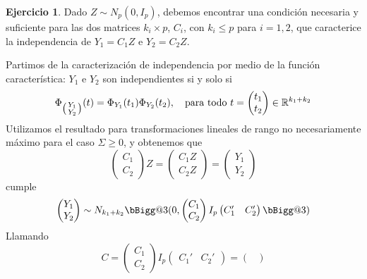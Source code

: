 \documentclass[12pt,spanish]{article}
\makeatletter
\newcommand{\vast}{\bBigg@{3}}
\theoremstyle{definition}
\newtheorem{exercise}{Ejercicio}
\makeatother
\begin{document}
\begin{exercise} %
  Dado $Z\sim N_p(0,I_p)$, debemos encontrar una condición necesaria y
  suficiente para las dos matrices $k_i\times p$, $C_i$, con
  $k_i\leq p$ para $i=1,2$, que caracterice la independencia de
  $Y_1=C_1 Z$ e $Y_2=C_2 Z$.

  Partimos de la caracterización de independencia por medio de la
  función característica: $Y_1$ e $Y_2$ son independientes si y solo si
  \begin{equation} \label{indep-caracteristica}
    \Phi_{
      \begin{psmallmatrix}
        Y_1 \\ Y_2
      \end{psmallmatrix}
    }(t)=\Phi_{Y_1}(t_1)\Phi_{Y_2}(t_2),\quad\text{para todo } t=\begin{pmatrix}
      t_1 \\ t_2
    \end{pmatrix}\in\mathbb{R}^{k_1+k_2}
  \end{equation}
  Utilizamos el resultado para transformaciones lineales de rango no
  necesariamente máximo para el caso $\Sigma\geq 0$, y obtenemos que
  \[\begin{pmatrix}
      C_1 \\ C_2
    \end{pmatrix}Z=\begin{pmatrix}
      C_1 Z \\ C_2 Z
    \end{pmatrix}=\begin{pmatrix}
      Y_1 \\ Y_2
    \end{pmatrix}\]
  cumple
  \[\begin{pmatrix}
      Y_1 \\ Y_2
    \end{pmatrix}\sim N_{k_1+k_2}\vast(0,\begin{pmatrix}
      C_1 \\ C_2
    \end{pmatrix} I_p \begin{pmatrix}
      C_1' & C_2'
    \end{pmatrix}\vast)\]
  Llamando \[C=\begin{pmatrix}
      C_1 \\ C_2
    \end{pmatrix} I_p \begin{pmatrix}
      C_1' & C_2'
    \end{pmatrix}=\begin{pmatrix}

\end{pmatrix}\]
\end{exercise}
\end{document}
